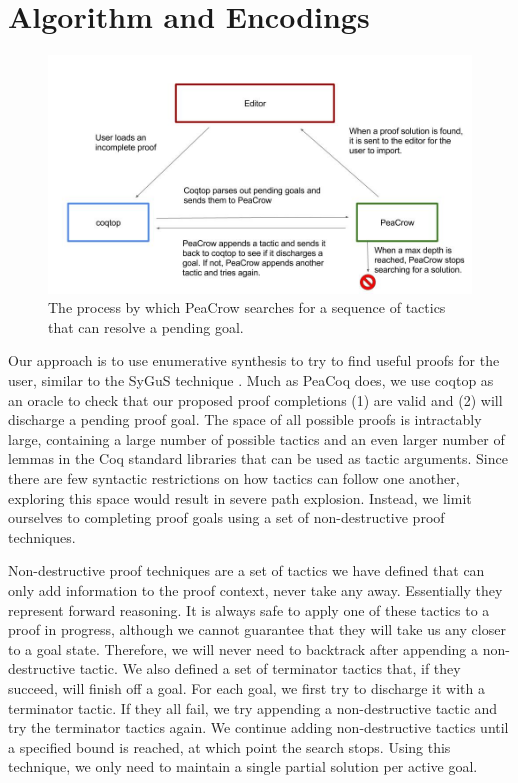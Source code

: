 \documentclass{article}
\begin{document}
\section{Algorithm and Encodings}
\begin{figure}
\centering
\includegraphics[width=\textwidth]{PeaCrowprocess}
\caption{The process by which PeaCrow searches for a sequence of tactics that can resolve a pending goal.}
\end{figure}
Our approach is to use enumerative synthesis to try to find useful proofs for the user, similar to the SyGuS technique \cite{alur2015syntax}. Much as PeaCoq does, we use coqtop as an oracle to check that our proposed proof completions (1) are valid and (2) will discharge a pending proof goal. The space of all possible proofs is intractably large, containing a large number of possible tactics and an even larger number of lemmas in the Coq standard libraries that can be used as tactic arguments. Since there are few syntactic restrictions on how tactics can follow one another, exploring this space would result in severe path explosion. Instead, we limit ourselves to completing proof goals using a set of non-destructive proof techniques.

Non-destructive proof techniques are a set of tactics we have defined that can only add information to the proof context, never take any away. Essentially they represent forward reasoning. It is always safe to apply one of these tactics to a proof in progress, although we cannot guarantee that they will take us any closer to a goal state. Therefore, we will never need to backtrack after appending a non-destructive tactic. We also defined a set of terminator tactics that, if they succeed, will finish off a goal. For each goal, we first try to discharge it with a terminator tactic. If they all fail, we try appending a non-destructive tactic and try the terminator tactics again. We continue adding non-destructive tactics until a specified bound is reached, at which point the search stops. Using this technique, we only need to maintain a single partial solution per active goal.
\end{document}
